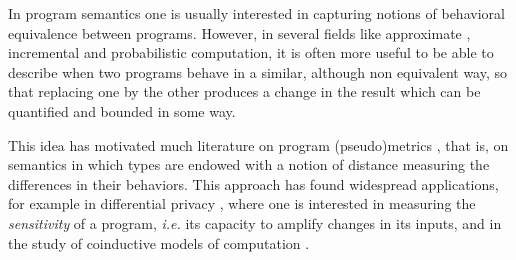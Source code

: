 
In program semantics one is usually interested in capturing notions of behavioral equivalence between programs. However,  
in several fields like approximate \cite{Mittal2016}, incremental \cite{Cai2014, Picallo2019} and probabilistic \cite{10.1109/LICS.2015.64} computation, it is often more useful to be able to describe when two programs behave in a similar, although non equivalent way, so that replacing one by the other produces a change in the result which can be quantified and bounded in some way.



This idea has motivated much literature on program (pseudo)metrics \cite{ARNOLD1980181, VANBREUGEL20011,Azevedo_de_Amorim_2017, Escardo1999, BAIER1994171,10.1109/LICS.2015.64, 10.1007/978-3-662-44584-6_4, 10.1007/978-3-662-54434-1_13, 10.1145/3209108.3209149}, that is, on semantics in which types are endowed with a notion of distance measuring the differences in their behaviors. This approach has found widespread applications, for example in differential privacy \cite{10.1145/1932681.1863568, 10.1007/978-3-642-29420-4_3, Barthe_2012}, where one is interested in measuring the \emph{sensitivity} of a program, \textit{i.e.} its capacity to amplify changes in its inputs, and in the study of coinductive models of computation \cite{DESHARNAIS2004323, VANBREUGEL2005115, 10.1007/978-3-662-44584-6_4,10.1007/3-540-48224-5_35}.
%

 
 
 
% 
% 
    
